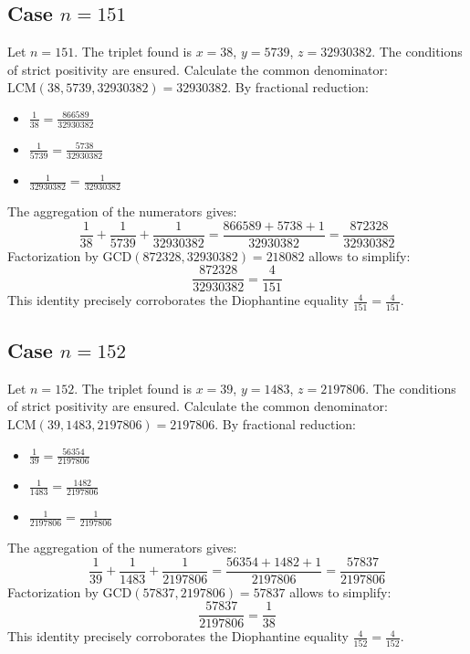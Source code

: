 \documentclass[11pt,a4paper]{article}
\begin{document}
\subsection{Case $n = 151$}
Let $n = 151$. The triplet found is $x = 38$, $y = 5739$, $z = 32930382$.
The conditions of strict positivity are ensured.
Calculate the common denominator: $\text{LCM}(38, 5739, 32930382) = 32930382$.
By fractional reduction:
\begin{itemize}
    \item $\frac{1}{38} = \frac{866589}{32930382}$
    \item $\frac{1}{5739} = \frac{5738}{32930382}$
    \item $\frac{1}{32930382} = \frac{1}{32930382}$
\end{itemize}
The aggregation of the numerators gives:
$$ \frac{1}{38} + \frac{1}{5739} + \frac{1}{32930382} = \frac{866589 + 5738 + 1}{32930382} = \frac{872328}{32930382} $$
Factorization by $\text{GCD}(872328, 32930382) = 218082$ allows to simplify:
$$ \frac{872328}{32930382} = \frac{4}{151} $$
This identity precisely corroborates the Diophantine equality $\frac{4}{151} = \frac{4}{151}$.

\subsection{Case $n = 152$}
Let $n = 152$. The triplet found is $x = 39$, $y = 1483$, $z = 2197806$.
The conditions of strict positivity are ensured.
Calculate the common denominator: $\text{LCM}(39, 1483, 2197806) = 2197806$.
By fractional reduction:
\begin{itemize}
    \item $\frac{1}{39} = \frac{56354}{2197806}$
    \item $\frac{1}{1483} = \frac{1482}{2197806}$
    \item $\frac{1}{2197806} = \frac{1}{2197806}$
\end{itemize}
The aggregation of the numerators gives:
$$ \frac{1}{39} + \frac{1}{1483} + \frac{1}{2197806} = \frac{56354 + 1482 + 1}{2197806} = \frac{57837}{2197806} $$
Factorization by $\text{GCD}(57837, 2197806) = 57837$ allows to simplify:
$$ \frac{57837}{2197806} = \frac{1}{38} $$
This identity precisely corroborates the Diophantine equality $\frac{4}{152} = \frac{4}{152}$.
\end{document}
